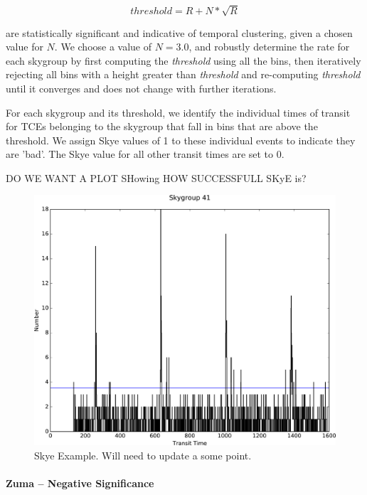 \begin{equation}
threshold = R + N*\sqrt{R}
\end{equation}

\noindent are statistically significant and indicative of temporal clustering, given a chosen value for $N$. We choose a value of $N = 3.0$, and robustly determine the rate for each skygroup by first computing the \emph{threshold} using all the bins, then iteratively rejecting all bins with a height greater than \emph{threshold} and re-computing \emph{threshold} until it converges and does not change with further iterations.

For each skygroup and its threshold, we identify the individual times of transit for TCEs belonging to the skygroup that fall in bins that are above the threshold. We assign Skye values of 1 to these individual events to indicate they are 'bad'. The Skye value for all other transit times are set to 0.  

DO WE WANT A PLOT SHowing HOW SUCCESSFULL SKyE is? 

\begin{figure}[h]
\centering
\includegraphics[width=\linewidth]{Skye-Paper-Plot.png}
\caption{Skye Example. Will need to update a some point.}
\label{skyefig}
\end{figure}



\paragraph{Zuma -- Negative Significance}

